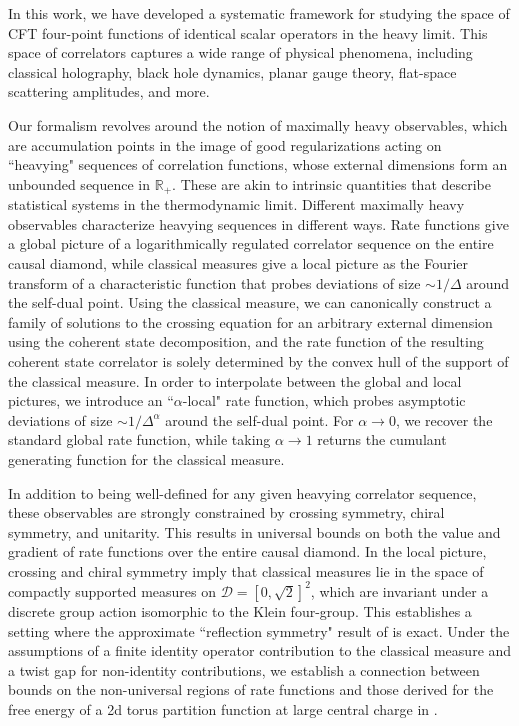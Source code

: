 \documentclass[a4paper,11pt]{article}
\theoremstyle{plain}
\theoremstyle{definition}
\theoremstyle{remark}
\newcommand{\De}{\Delta}
\begin{document}
In this work, we have developed a systematic framework for studying the space of CFT four-point functions of identical scalar operators in the heavy limit. This space of correlators captures a wide range of physical phenomena, including classical holography, black hole dynamics, planar gauge theory, flat-space scattering amplitudes, and more.

Our formalism revolves around the notion of maximally heavy observables, which are accumulation points in the image of good regularizations acting on ``heavying" sequences of correlation functions, whose external dimensions form an unbounded sequence in $\mathbb{R}_+$. These are akin to intrinsic quantities that describe statistical systems in the thermodynamic limit. Different maximally heavy observables characterize heavying sequences in different ways. Rate functions give a global picture of a logarithmically regulated correlator sequence on the entire causal diamond, while classical measures give a local picture as the Fourier transform of a characteristic function that probes deviations of size $\sim1/\De$ around the self-dual point. Using the classical measure, we can canonically construct a family of solutions to the crossing equation for an arbitrary external dimension using the coherent state decomposition, and the rate function of the resulting coherent state correlator is solely determined by the convex hull of the support of the classical measure. In order to interpolate between the global and local pictures, we introduce an  ``$\alpha$-local" rate function, which probes asymptotic deviations of size $\sim1/\De^{\alpha}$ around the self-dual point. For $\alpha \to 0$, we recover the standard global rate function, while taking $\alpha\to1$ returns the cumulant generating function for the classical measure. 

In addition to being well-defined for any given heavying correlator sequence, these observables are strongly constrained by crossing symmetry, chiral symmetry, and unitarity. This results in universal bounds on both the value and gradient of rate functions over the entire causal diamond. In the local picture, crossing and chiral symmetry imply that classical measures lie in the space of compactly supported measures on $\mathcal{D} = [0,\sqrt{2}]^2$, which are invariant under a discrete group action isomorphic to the Klein four-group. This establishes a setting where the approximate ``reflection symmetry" result of \cite{Kim2015-sg} is exact. Under the assumptions of a finite identity operator contribution to the classical measure and a twist gap for non-identity contributions, we establish a connection between bounds on the non-universal regions of rate functions and those derived for the free energy of a 2d torus partition function at large central charge in \cite{Hartman:2014oaa,Dey:2024nje}.
\end{document}
